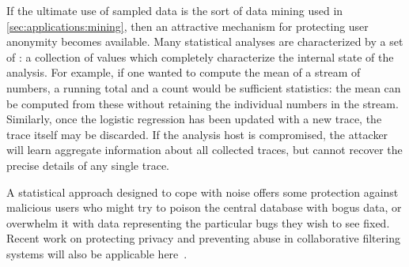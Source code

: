 If the ultimate use of sampled data is the sort of data mining used in
\autoref{sec:applications:mining}, then an attractive mechanism for
protecting user anonymity becomes available.  Many statistical
analyses are characterized by a set of : a collection of values which completely characterize
the internal state of the analysis.  For example, if one wanted to
compute the mean of a stream of numbers, a running total and a count
would be sufficient statistics: the mean can be computed from these
without retaining the individual numbers in the stream.  Similarly,
once the logistic regression has been updated with a new trace, the
trace itself may be discarded.  If the analysis host is compromised,
the attacker will learn aggregate information about all collected
traces, but cannot recover the precise details of any single trace.

A statistical approach designed to cope with noise offers some
protection against malicious users who might try to poison the central
database with bogus data, or overwhelm it with data representing the
particular bugs they wish to see fixed.  Recent work on protecting
privacy and preventing abuse in collaborative filtering systems will
also be applicable here~\cite{Canny2002,EC00*150}.

